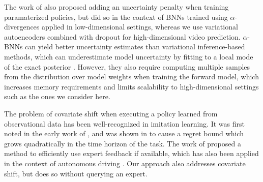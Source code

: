 \documentclass{article} %
\begin{document}
The work of \citep{depeweg18} also proposed adding an uncertainty penalty when training paramaterized policies, but did so in the context of BNNs trained using $\alpha$-divergences applied in low-dimensional settings, whereas we use variational autoencoders combined with dropout for high-dimensional video prediction. 
$\alpha$-BNNs can yield better uncertainty estimates than variational inference-based methods, which can underestimate model uncertainty by fitting to a local mode of the exact posterior \citep{depeweg16, alpha-bnn}. However, they also require computing multiple samples from the distribution over model weights when training the forward model, which increases memory requirements and limits scalability to high-dimensional settings such as the ones we consider here. 





The problem of covariate shift when executing a policy learned from observational data has been well-recognized in imitation learning.
It was first noted in the early work of \citep{Pomerleau91}, and was shown in \citep{Ross2010EfficientRF} to cause a regret bound which grows quadratically in the time horizon of the task.
The work of \citep{Dagger} proposed a method to efficiently use expert feedback if available, which has also been applied in the context of autonomous driving \citep{Zhang16}.
Our approach also addresses covariate shift, but does so without querying an expert.
\end{document}
